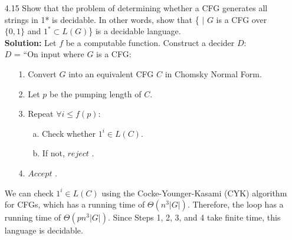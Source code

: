 \begin{enumerate}
\item[4.15]Show that the problem of determining whether a CFG generates all strings in 1* is decidable. In other words, show that \{ $|$ $G$ is a CFG over $\{0, 1\}$ and $1^* \subset L(G)$\} is a decidable language. 
\\
\textbf{Solution:} Let $f$ be a computable function. Construct a decider $D$:
\\
$D$ = ``On input  where $G$ is a CFG:
\begin{enumerate}
\itemsep0em
\item[1.]Convert $G$ into an equivalent CFG $C$ in Chomsky Normal Form.
\item[2.]Let $p$ be the pumping length of $C$.
\item[3.]Repeat $\forall i \le f(p)$:
\begin{enumerate}
\item[a.]Check whether $1^i \in L(C)$.
\item[b.]If not, $reject$ .
\end{enumerate}
\item[4.]$Accept$ .
\end{enumerate}
We can check $1^i \in L(C)$ using the Cocke-Younger-Kasami (CYK) algorithm for CFGs, which has a running time of $\Theta(n^3 |G|)$. Therefore, the loop has a running time of $\Theta(pn^3 |G|)$. Since Steps 1, 2, 3, and 4 take finite time, this language is decidable.


\end{enumerate}

